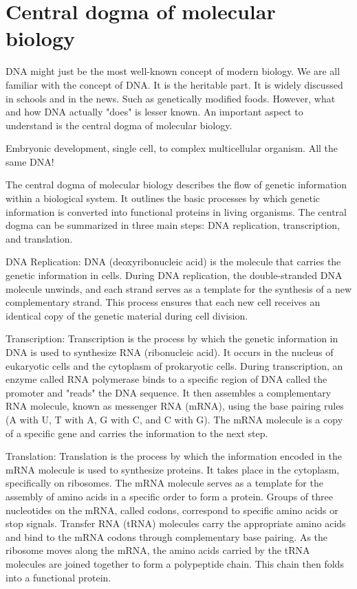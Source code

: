 \section{Central dogma of molecular biology}

DNA might just be the most well-known concept of modern biology. 
We are all familiar with the concept of DNA. It is the heritable part. It is widely discussed in schools and in the news. Such as genetically modified foods. However, what and how DNA actually "does" is lesser known. An important aspect to understand is the central dogma of molecular biology.

Embryonic development, single cell, to complex multicellular organism. All the same DNA!

The central dogma of molecular biology describes the flow of genetic information within a biological system. It outlines the basic processes by which genetic information is converted into functional proteins in living organisms. The central dogma can be summarized in three main steps: DNA replication, transcription, and translation.

DNA Replication: DNA (deoxyribonucleic acid) is the molecule that carries the genetic information in cells. During DNA replication, the double-stranded DNA molecule unwinds, and each strand serves as a template for the synthesis of a new complementary strand. This process ensures that each new cell receives an identical copy of the genetic material during cell division.

Transcription: Transcription is the process by which the genetic information in DNA is used to synthesize RNA (ribonucleic acid). It occurs in the nucleus of eukaryotic cells and the cytoplasm of prokaryotic cells. During transcription, an enzyme called RNA polymerase binds to a specific region of DNA called the promoter and "reads" the DNA sequence. It then assembles a complementary RNA molecule, known as messenger RNA (mRNA), using the base pairing rules (A with U, T with A, G with C, and C with G). The mRNA molecule is a copy of a specific gene and carries the information to the next step.

Translation: Translation is the process by which the information encoded in the mRNA molecule is used to synthesize proteins. It takes place in the cytoplasm, specifically on ribosomes. The mRNA molecule serves as a template for the assembly of amino acids in a specific order to form a protein. Groups of three nucleotides on the mRNA, called codons, correspond to specific amino acids or stop signals. Transfer RNA (tRNA) molecules carry the appropriate amino acids and bind to the mRNA codons through complementary base pairing. As the ribosome moves along the mRNA, the amino acids carried by the tRNA molecules are joined together to form a polypeptide chain. This chain then folds into a functional protein.


